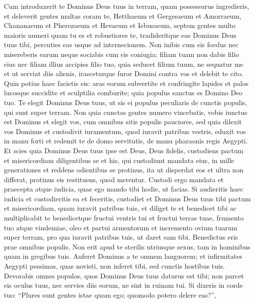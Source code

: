\begin{biblechapter} 
\verse Cum introduxerit te Dominus Deus tuus in terram, quam possessurus ingredieris, et deleverit gentes multas coram te, Hetthaeum et Gergesaeum et Amorraeum, Chananaeum et Pherezaeum et Hevaeum et Iebusaeum, septem gentes multo maioris numeri quam tu es et robustiores te, 
\verse tradideritque eas Dominus Deus tuus tibi, percuties eas usque ad internecionem. Non inibis cum eis foedus nec misereberis earum  
\verse neque sociabis cum eis coniugia; filiam tuam non dabis filio eius nec filiam illius accipies filio tuo, 
\verse quia seducet filium tuum, ne sequatur me et ut serviat diis alienis, irasceturque furor Domini contra vos et delebit te cito.  
\verse Quin potius haec facietis eis: aras eorum subvertite et confringite lapides et palos lucosque succidite et sculptilia comburite; 
\verse quia populus sanctus es Domino Deo tuo. Te elegit Dominus Deus tuus, ut sis ei populus peculiaris de cunctis populis, qui sunt super terram. 
\verse Non quia cunctas gentes numero vincebatis, vobis iunctus est Dominus et elegit vos, cum omnibus sitis populis pauciores, 
\verse sed quia dilexit vos Dominus et custodivit iuramentum, quod iuravit patribus vestris, eduxit vos in manu forti et redemit te de domo servitutis, de manu pharaonis regis Aegypti. 
\verse Et scies quia Dominus Deus tuus ipse est Deus, Deus fidelis, custodiens pactum et misericordiam diligentibus se et his, qui custodiunt mandata eius, in mille generationes  
\verse et reddens odientibus se protinus, ita ut disperdat eos et ultra non differat, protinus eis restituens, quod merentur. 
\verse Custodi ergo mandata et praecepta atque iudicia, quae ego mando tibi hodie, ut facias. 
\verse Si audieritis haec iudicia et custodieritis ea et feceritis, custodiet et Dominus Deus tuus tibi pactum et misericordiam, quam iuravit patribus tuis,  
\verse et diliget te et benedicet tibi ac multiplicabit te benedicetque fructui ventris tui et fructui terrae tuae, frumento tuo atque vindemiae, oleo et partui armentorum et incremento ovium tuarum super terram, pro qua iuravit patribus tuis, ut daret eam tibi. 
\verse Benedictus eris prae omnibus populis. Non erit apud te sterilis utriusque sexus, tam in hominibus quam in gregibus tuis. 
\verse Auferet Dominus a te omnem languorem; et infirmitates Aegypti pessimas, quas novisti, non inferet tibi, sed cunctis hostibus tuis. 
\verse Devorabis omnes populos, quos Dominus Deus tuus daturus est tibi; non parcet eis oculus tuus, nec servies diis eorum, ne sint in ruinam tui. 
\verse Si dixeris in corde tuo: “Plures sunt gentes istae quam ego; quomodo potero delere eas?”, 

\end{biblechapter}
